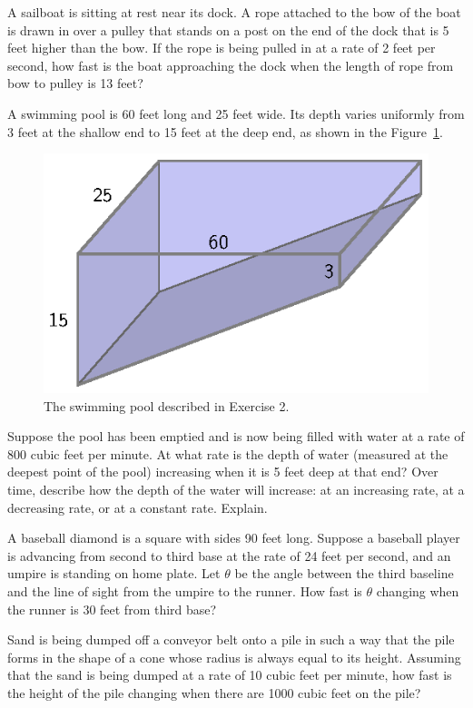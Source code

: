 \begin{exercises} 
	\item A sailboat is sitting at rest near its dock.  A rope attached to the bow of the boat is drawn in over a pulley that stands on a post on the  end of the dock that is 5 feet higher than the bow.  If the rope is being pulled in at a rate of 2 feet per second, how fast is the boat approaching the dock when the length of rope from bow to pulley is 13 feet?
	
	\item A swimming pool is 60 feet long and 25 feet wide. Its depth varies uniformly from 3 feet at the shallow end to 15 feet at the deep end, as shown in the Figure~\ref{F:3.5.Ez3}.
\begin{figure}[h]
\begin{center}
\includegraphics{figures/3_5_Ez3.eps}
\caption{The swimming pool described in Exercise 2.} \label{F:3.5.Ez3}
\end{center}
\end{figure}
Suppose the pool has been emptied and is now being filled with water at a rate of 800 cubic feet per minute. At what rate is the depth of water (measured at the deepest point of the pool) increasing when it is 5 feet deep at that end?  Over time, describe how the depth of the water will increase:  at an increasing rate, at a decreasing rate, or at a constant rate.  Explain.	
	
	\item A baseball diamond is a square with sides 90 feet long.  Suppose a baseball player is advancing from second to third base at the rate of 24 feet per second, and an umpire is standing on home plate.  Let  $\theta$ be the angle between the third baseline and the line of sight from the umpire to the runner.  How fast is $\theta$ changing when the runner is 30 feet from third base?
	
	\item Sand is being dumped off a conveyor belt onto a pile in such a way that the pile forms in the shape of a cone whose radius is always equal to its height.  Assuming that the sand is being dumped at a rate of 10 cubic feet per minute, how fast is the height of the pile changing when there are 1000 cubic feet on the pile?
	


\end{exercises}
\afterexercises